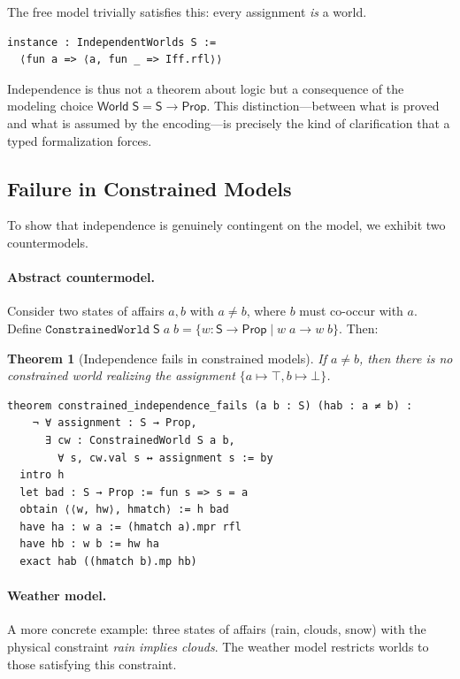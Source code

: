 \documentclass[10pt, letterpaper]{article}
\newtheorem{theorem}{Theorem}[section]
\theoremstyle{definition}
\theoremstyle{remark}
\newcommand{\Sach}{\mathsf{S}}
\newcommand{\World}{\mathsf{World}}
\newcommand{\Prop}{\mathsf{Prop}}
\begin{document}
\noindent
The free model trivially satisfies this: every assignment
\emph{is} a world.

\begin{lstlisting}
instance : IndependentWorlds S :=
  ⟨fun a => ⟨a, fun _ => Iff.rfl⟩⟩
\end{lstlisting}

\noindent
Independence is thus not a theorem about logic but a consequence
of the modeling choice $\World\;\Sach = \Sach \to \Prop$.
This distinction---between what is proved and what is assumed by
the encoding---is precisely the kind of clarification that a
typed formalization forces.

\subsection{Failure in Constrained Models}
\label{sec:constrained}

To show that independence is genuinely contingent on the model,
we exhibit two countermodels.

\paragraph{Abstract countermodel.}
Consider two states of affairs $a, b$ with $a \neq b$, where
$b$ must co-occur with $a$.  Define
$\mathtt{ConstrainedWorld}\;\Sach\;a\;b = \{w : \Sach \to \Prop
\mid w\;a \to w\;b\}$.  Then:

\begin{theorem}[Independence fails in constrained models]
\label{thm:constrained}
If $a \neq b$, then there is no constrained world realizing the
assignment $\{a \mapsto \top, b \mapsto \bot\}$.
\end{theorem}

\begin{lstlisting}
theorem constrained_independence_fails (a b : S) (hab : a ≠ b) :
    ¬ ∀ assignment : S → Prop,
      ∃ cw : ConstrainedWorld S a b,
        ∀ s, cw.val s ↔ assignment s := by
  intro h
  let bad : S → Prop := fun s => s = a
  obtain ⟨⟨w, hw⟩, hmatch⟩ := h bad
  have ha : w a := (hmatch a).mpr rfl
  have hb : w b := hw ha
  exact hab ((hmatch b).mp hb)
\end{lstlisting}

\paragraph{Weather model.}
A more concrete example: three states of affairs (rain, clouds,
snow) with the physical constraint \emph{rain implies clouds}.
The weather model restricts worlds to those satisfying this
constraint.
\end{document}
